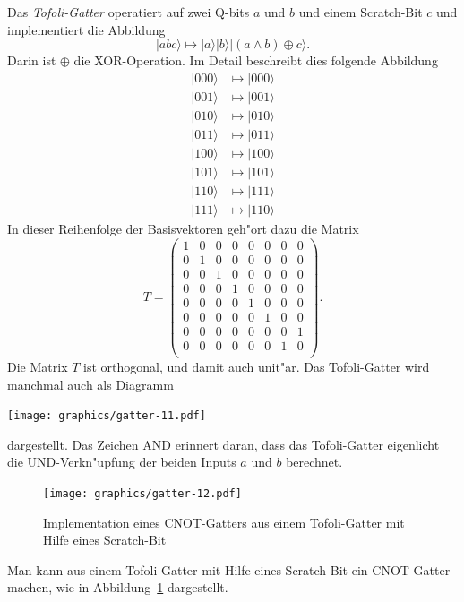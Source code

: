 \begin{beispiel}
Das {\em Tofoli-Gatter} operatiert auf zwei Q-bits $a$ und $b$ und einem
Scratch-Bit $c$ und implementiert die Abbildung
\[
|abc\rangle
\mapsto
|a\rangle|b\rangle|(a\wedge b)\oplus c\rangle.
\]
Darin ist $\oplus$ die XOR-Operation. 
Im Detail beschreibt dies folgende Abbildung
\begin{align*}
|000\rangle&\mapsto|000\rangle\\
|001\rangle&\mapsto|001\rangle\\
|010\rangle&\mapsto|010\rangle\\
|011\rangle&\mapsto|011\rangle\\
|100\rangle&\mapsto|100\rangle\\
|101\rangle&\mapsto|101\rangle\\
|110\rangle&\mapsto|111\rangle\\
|111\rangle&\mapsto|110\rangle
\end{align*}
In dieser Reihenfolge der Basisvektoren geh"ort dazu die Matrix
\[
T=
\begin{pmatrix}
1&0&0&0&0&0&0&0\\
0&1&0&0&0&0&0&0\\
0&0&1&0&0&0&0&0\\
0&0&0&1&0&0&0&0\\
0&0&0&0&1&0&0&0\\
0&0&0&0&0&1&0&0\\
0&0&0&0&0&0&0&1\\
0&0&0&0&0&0&1&0\\
\end{pmatrix}.
\]
Die Matrix $T$ ist orthogonal, und damit auch unit"ar.
Das Tofoli-Gatter wird manchmal auch als Diagramm
\begin{center}
\texttt{[image: graphics/gatter-11.pdf]}
\end{center}
dargestellt. Das Zeichen \textsc{AND} erinnert daran, dass das Tofoli-Gatter
eigenlicht die UND-Verkn"upfung der beiden Inputs $a$ und $b$ berechnet.
\end{beispiel}

\begin{beispiel}
\begin{figure}
\centering
\texttt{[image: graphics/gatter-12.pdf]}
\caption{Implementation eines \textsc{CNOT}-Gatters aus einem Tofoli-Gatter
mit Hilfe eines Scratch-Bit \label{skript:cnot=tofoli}}
\end{figure}
Man kann aus einem Tofoli-Gatter mit Hilfe eines Scratch-Bit ein
\textsc{CNOT}-Gatter machen, wie in Abbildung~\ref{skript:cnot=tofoli}
dargestellt.
\end{beispiel}

